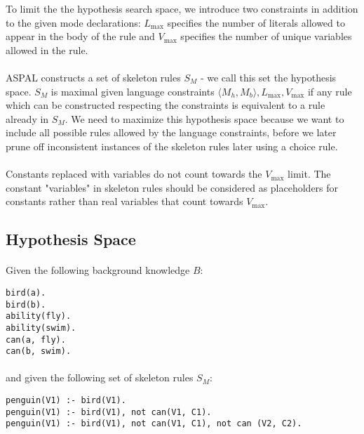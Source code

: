 \documentclass{article}
\theoremstyle{plain}
\theoremstyle{definition}
\begin{document}
\begin{multicols}{2}
To limit the the hypothesis search space, we introduce two constraints in addition to the given mode declarations: $L_\text{max}$ specifies the number of literals allowed to appear in the body of the rule and $V_\text{max}$ specifies the number of unique variables allowed in the rule.

\paragraph{} ASPAL constructs a set of skeleton rules $S_M$ - we call this set the hypothesis space. $S_M$ is maximal given language constraints $\langle M_h, M_b \rangle, L_\text{max}, V_\text{max}$ if any rule which can be constructed respecting the constraints is equivalent to a rule already in $S_M$. We need to maximize this hypothesis space because we want to include all possible rules allowed by the language constraints, before we later prune off inconsistent instances of the skeleton rules later using a choice rule.

\paragraph{} Constants replaced with variables do not count towards the $V_\text{max}$ limit. \cite[p. 6]{lawnonmonotonic} The constant "variables" in skeleton rules should be considered as placeholders for constants rather than real variables that count towards $V_\text{max}$.

\subsection{Hypothesis Space}\label{sec:ASPALHypothesisSpace}

\paragraph{} Given the following background knowledge $B$:

\begin{lstlisting}
bird(a).
bird(b).
ability(fly).
ability(swim).
can(a, fly).
can(b, swim).
\end{lstlisting}

\paragraph{} and given the following set of skeleton rules $S_M$:

\begin{lstlisting}
penguin(V1) :- bird(V1).
penguin(V1) :- bird(V1), not can(V1, C1).
penguin(V1) :- bird(V1), not can(V1, C1), not can (V2, C2).
\end{lstlisting}


\end{multicols}
\end{document}
